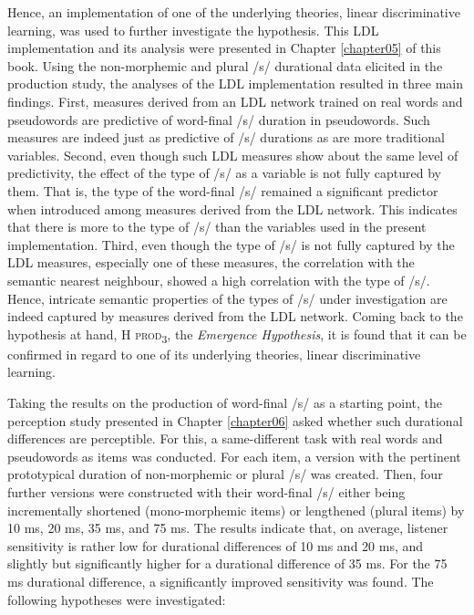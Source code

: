 Hence, an implementation of one of the underlying theories, linear discriminative learning, was used to further investigate the hypothesis. This LDL implementation and its analysis were presented in Chapter \ref{chapter05} of this book. Using the non-morphemic and plural /s/ durational data elicited in the production study, the analyses of the LDL implementation resulted in three main findings. First, measures derived from an LDL network trained on real words and pseudowords are predictive of word-final /s/ duration in pseudowords. Such measures are indeed just as predictive of /s/ durations as are more traditional variables. Second, even though such LDL measures show about the same level of predictivity, the effect of the type of /s/ as a variable is not fully captured by them. That is, the type of the word-final /s/ remained a significant predictor when introduced among measures derived from the LDL network. This indicates that there is more to the type of /s/ than the variables used in the present implementation. Third, even though the type of /s/ is not fully captured by the LDL measures, especially one of these measures, the correlation with the semantic nearest neighbour, showed a high correlation with the type of /s/. Hence, intricate semantic properties of the types of /s/ under investigation are indeed captured by measures derived from the LDL network. Coming back to the hypothesis at hand, \textsc{H prod\textsubscript{3}}, the \textit{Emergence Hypothesis}, it is found that it can be confirmed in regard to one of its underlying theories, linear discriminative learning.

Taking the results on the production of word-final /s/ as a starting point, the perception study presented in Chapter \ref{chapter06} asked whether such durational differences are perceptible. For this, a same-different task with real words and pseudowords as items was conducted. For each item, a version with the pertinent prototypical duration of non-morphemic or plural /s/ was created. Then, four further versions were constructed with their word-final /s/ either being incrementally shortened (mono-morphemic items) or lengthened (plural items) by 10 ms, 20 ms, 35 ms, and 75 ms. The results indicate that, on average, listener sensitivity is rather low for durational differences of 10 ms and 20 ms, and slightly but significantly higher for a durational difference of 35 ms. For the 75 ms durational difference, a significantly improved sensitivity was found. The following hypotheses were investigated:

